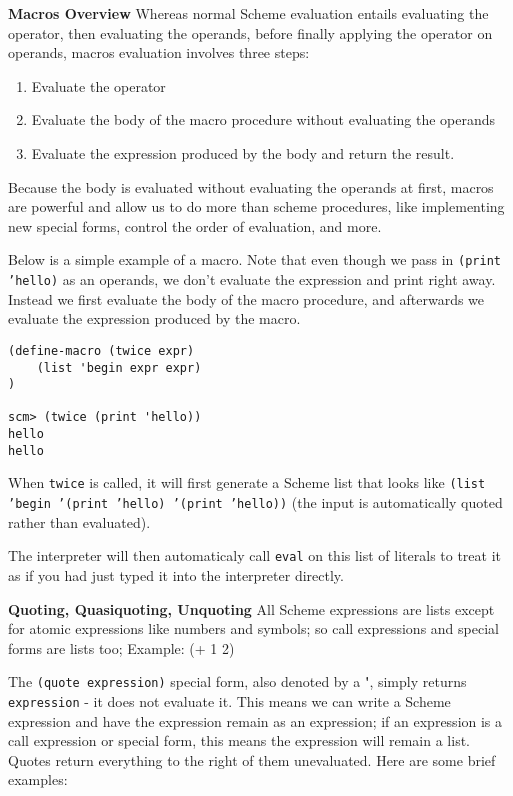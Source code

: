 \textbf{Macros Overview} Whereas normal Scheme evaluation entails evaluating the operator, then evaluating the operands, before finally applying the operator on operands, macros evaluation involves three steps:

\begin{enumerate}[1.]
\item Evaluate the operator
\item Evaluate the body of the macro procedure without evaluating the operands
\item Evaluate the expression produced by the body and return the result.
\end{enumerate}

Because the body is evaluated without evaluating the operands at first, macros are powerful and allow us to do more than scheme procedures, like implementing new special forms, control the order of evaluation, and more. 

Below is a simple example of a macro. Note that even though we pass in \texttt{(print 'hello)} as an operands, we don't evaluate the expression and print right away. Instead we first evaluate the body of the macro procedure, and afterwards we evaluate the expression produced by the macro. 
\vspace{1cm}
\begin{lstlisting}
(define-macro (twice expr)
    (list 'begin expr expr)
)

scm> (twice (print 'hello))
hello
hello
\end{lstlisting}

When \texttt{twice} is called, it will first generate a Scheme list that looks like \texttt{(list 'begin '(print 'hello) '(print 'hello))} (the input is automatically quoted rather than evaluated).

The interpreter will then automaticaly call \texttt{eval} on this list of literals to treat it as if you had just typed it into the interpreter directly. 

\newpage
\textbf{Quoting, Quasiquoting, Unquoting} All Scheme expressions are lists except for atomic expressions like numbers and symbols; so call expressions and special forms are lists too; Example: (+ 1 2)

The \texttt{(quote expression)} special form, also denoted by a \textbf{\'}, simply returns \texttt{expression} - it does not evaluate it. 
This means we can write a Scheme expression and have the expression remain as an expression; if an expression is a call expression or special form, this means the expression will remain a list. 
Quotes return everything to the right of them unevaluated. Here are some brief examples:

